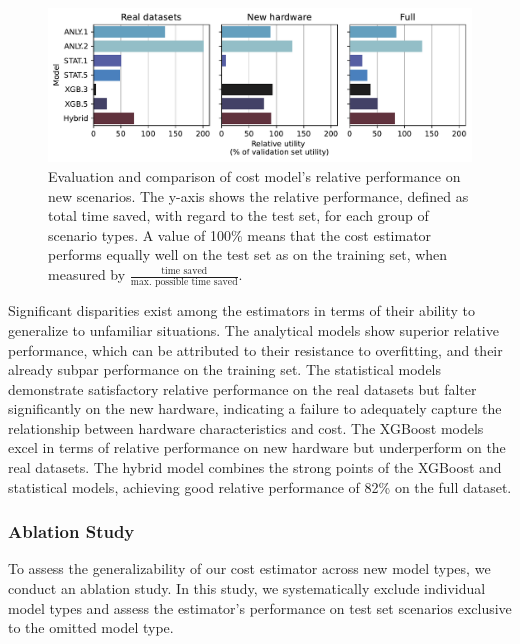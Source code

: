 \begin{figure}
    \centering
    \includegraphics[width=\linewidth]{chapters/06_evaluation/figures/eval_generalization.pdf}
    \caption[Evaluation of performance on new scenarios]{Evaluation and comparison of cost model's relative performance on new scenarios. The y-axis shows the relative performance, defined as total time saved, with regard to the test set, for each group of scenario types. A value of 100\% means that the cost estimator performs equally well on the test set as on the training set, when measured by $\frac{\text{time saved}}{\text{max. possible time saved}}$.}
    \label{fig:6-generalization}
\end{figure}

Significant disparities exist among the estimators in terms of their ability to generalize to unfamiliar situations. The analytical models show superior relative performance, which can be attributed to their resistance to overfitting, and their already subpar performance on the training set. The statistical models demonstrate satisfactory relative performance on the real datasets but falter significantly on the new hardware, indicating a failure to adequately capture the relationship between hardware characteristics and cost. The XGBoost models excel in terms of relative performance on new hardware but underperform on the real datasets. The hybrid model combines the strong points of the XGBoost and statistical models, achieving good relative performance of 82\% on the full dataset.

\subsubsection{Ablation Study}
\label{subsubsec:6-ablation}
To assess the generalizability of our cost estimator across new model types, we conduct an ablation study. In this study, we systematically exclude individual model types and assess the estimator’s performance on test set scenarios exclusive to the omitted model type.

